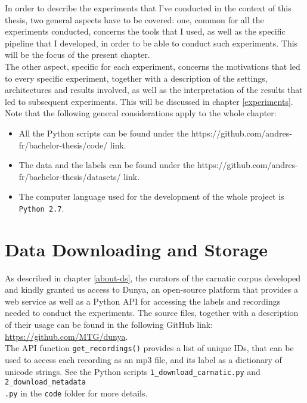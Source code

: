 In order to describe the experiments that I've conducted in the context of this thesis, two general aspects have to be covered: one, common for all the experiments conducted, concerns the tools that I used, as well as the specific pipeline that I developed, in order to be able to conduct such experiments. This will be the focus of the present chapter.\\
The other aspect, specific for each experiment, concerns the motivations that led to every specific experiment, together with a description of the settings, architectures and results involved, as well as the interpretation of the results that led to subsequent experiments. This will be discussed in chapter \ref{experiments}.\\

Note that the following general considerations apply to the whole chapter:
\begin{itemize}
\item All the Python scripts can be found under the https://github.com/andres-fr/bachelor-thesis/code/ link.
\item The data and the labels can be found under the https://github.com/andres-fr/bachelor-thesis/datasets/ link.
\item The computer language used for the development of the whole project is \texttt{Python 2.7}.
\end{itemize}



\section{Data Downloading and Storage}

As described in chapter \ref{about-ds}, the curators of the carnatic corpus developed and kindly granted us access to Dunya, an open-source platform that provides a web service as well as a Python API for accessing the labels and recordings needed to conduct the experiments. The source files, together with a description of their usage can be found in the following GitHub link: \url{https://github.com/MTG/dunya}.\\

The API function \texttt{get\_recordings()} provides a list of unique IDs, that can be used to access each recording as an mp3 file, and its label as a dictionary of unicode strings. See the Python scripts \texttt{1\_download\_carnatic.py} and \texttt{2\_download\_metadata\\.py} in the \texttt{code} folder for more details.\\


